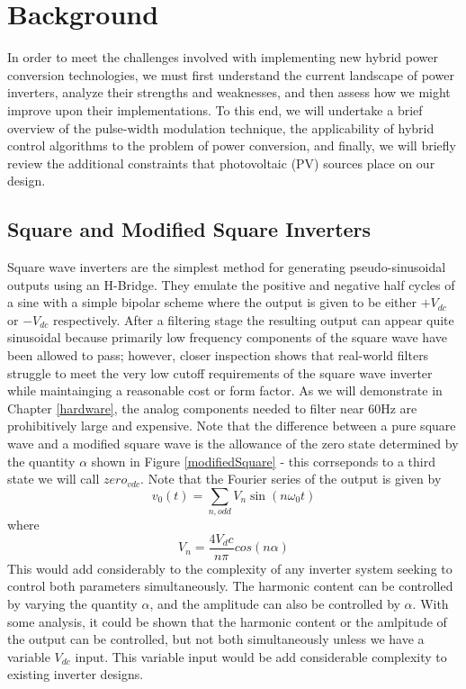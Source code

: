 \section{Background}
In order to meet the challenges involved with implementing new hybrid power conversion technologies, we must first understand the current landscape of power inverters, analyze their strengths and weaknesses, and then assess how we might improve upon their implementations. To this end, we will undertake a brief overview of the pulse-width modulation technique, the applicability of hybrid control algorithms to the problem of power conversion, and finally, we will briefly review the additional constraints that photovoltaic (PV) sources place on our design. 

\subsection{Square and Modified Square Inverters}
\label{squareApproach}
Square wave inverters are the simplest method for generating pseudo-sinusoidal outputs using an H-Bridge. They emulate the positive and negative half cycles of a sine with a simple bipolar scheme where the output is given to be either $+V_{dc}$ or $-V_{dc}$ respectively. After a filtering stage the resulting output can appear quite sinusoidal because primarily low frequency components of the square wave have been allowed to pass; however, closer inspection shows that real-world filters struggle to meet the very low cutoff requirements of the square wave inverter while maintainging a reasonable cost or form factor. As we will demonstrate in Chapter \ref{hardware}, the analog components needed to filter near 60Hz are prohibitively large and expensive. Note that the difference between a pure square wave and a modified square wave is the allowance of the zero state determined by the quantity $\alpha$ shown in Figure \ref{modifiedSquare} - this corrseponds to a third state we will call $zero_{vdc}$. Note that the Fourier series of the output is given by 
\begin{equation}
v_0(t)=\sum\limits_{n,odd}V_n\sin{(n\omega_0t)}
\end{equation}
where 
\begin{equation}
V_n=\frac{4V_dc}{n\pi}cos{(n\alpha)}
\end{equation}
This would add considerably to the complexity of any inverter system seeking to control both parameters simultaneously. The harmonic content can be controlled by varying the quantity $\alpha$, and the amplitude can also be controlled by $\alpha$. With some analysis, it could be shown that the harmonic content or the amlpitude of the output can be controlled, but not both simultaneously unless we have a variable $V_{dc}$ input. This variable input would be add considerable complexity to existing inverter designs.  

